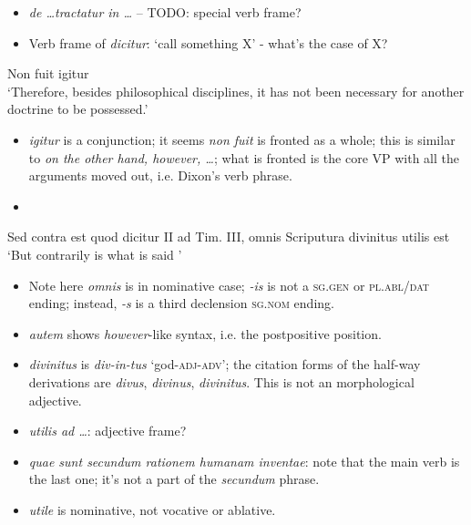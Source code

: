 \documentclass[a4paper, 12pt]{article}
\newcommand{\form}[1]{\emph{#1}}
\newcommand*{\category}[1]{\textsc{#1}}
\newcommand{\translate}[1]{`#1'}
\begin{document}
\begin{itemize}
    \item \form{de \dots tractatur in \dots} -- TODO: special verb frame?
    \item Verb frame of \form{dicitur}: \translate{call something X} - what's the case of X?
\end{itemize}

\begin{exe}
    \ex Non fuit igitur \\
    \translate{Therefore, besides philosophical disciplines, 
    it has not been necessary for another doctrine to be possessed.}
\end{exe}

\begin{itemize}
    \item \form{igitur} is a conjunction; it seems \form{non fuit} is fronted as a whole; 
    this is similar to \form{on the other hand, however, \dots}; 
    what is fronted is the core VP 
    with all the arguments moved out, i.e. Dixon's verb phrase.
    \item 
\end{itemize}

\begin{exe}
    \ex Sed contra est quod dicitur II ad Tim. III, omnis Scriputura divinitus utilis est \\
    \translate{But contrarily is what is said }
\end{exe}

\begin{itemize}
    \item Note here \form{omnis} is in nominative case; 
    \form{-is} is not a \category{sg.gen} or \category{pl.abl/dat} ending;
    instead, \form{-s} is a third declension \category{sg.nom} ending. 
    \item \form{autem} shows \form{however}-like syntax, i.e. the postpositive position.
    \item \form{divinitus} is \form{div-in-tus} \translate{god-\category{adj}-\category{adv}}; 
    the citation forms of the half-way derivations are 
    \form{divus}, \form{divinus}, \form{divinitus}.
    This is not an morphological adjective. 
    \item \form{utilis ad \dots}: adjective frame?
    \item \form{quae sunt secundum rationem humanam inventae}: note that the main verb is the last one; 
    it's not a part of the \form{secundum} phrase.
    \item \form{utile} is nominative, not vocative or ablative.
\end{itemize}
\end{document}
